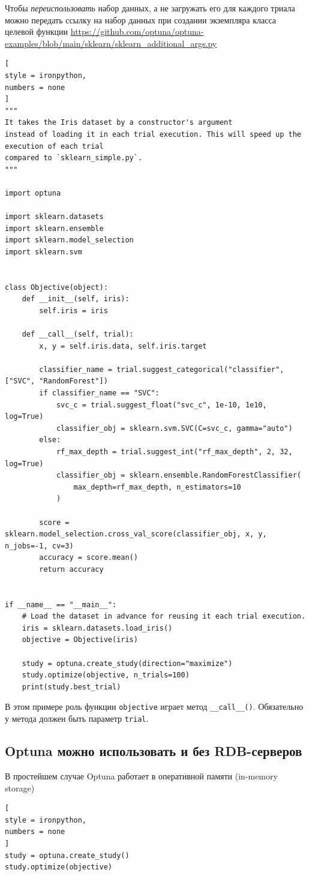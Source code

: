 \documentclass[%
	11pt,
	a4paper,
	utf8,
		]{article}
\begin{document}
Чтобы \emph{переиспользовать} набор данных, а не загружать его для каждого триала можно передать ссылку на набор данных при создании экземпляра класса целевой функции \url{https://github.com/optuna/optuna-examples/blob/main/sklearn/sklearn_additional_args.py}
\begin{lstlisting}[
style = ironpython,
numbers = none
]
"""
It takes the Iris dataset by a constructor's argument
instead of loading it in each trial execution. This will speed up the execution of each trial
compared to `sklearn_simple.py`.
"""

import optuna

import sklearn.datasets
import sklearn.ensemble
import sklearn.model_selection
import sklearn.svm


class Objective(object):
	def __init__(self, iris):
		self.iris = iris

	def __call__(self, trial):
		x, y = self.iris.data, self.iris.target

		classifier_name = trial.suggest_categorical("classifier", ["SVC", "RandomForest"])
		if classifier_name == "SVC":
			svc_c = trial.suggest_float("svc_c", 1e-10, 1e10, log=True)
			classifier_obj = sklearn.svm.SVC(C=svc_c, gamma="auto")
		else:
			rf_max_depth = trial.suggest_int("rf_max_depth", 2, 32, log=True)
			classifier_obj = sklearn.ensemble.RandomForestClassifier(
				max_depth=rf_max_depth, n_estimators=10
			)

		score = sklearn.model_selection.cross_val_score(classifier_obj, x, y, n_jobs=-1, cv=3)
		accuracy = score.mean()
		return accuracy


if __name__ == "__main__":
	# Load the dataset in advance for reusing it each trial execution.
	iris = sklearn.datasets.load_iris()
	objective = Objective(iris)

	study = optuna.create_study(direction="maximize")
	study.optimize(objective, n_trials=100)
	print(study.best_trial)
\end{lstlisting}

В этом примере роль функции \verb|objective| играет метод \verb|__call__()|. Обязательно у метода должен быть параметр \verb|trial|.

\subsection{Optuna можно использовать и без RDB-серверов}

В простейшем случае Optuna работает в оперативной памяти (in-memory storage)
\begin{lstlisting}[
style = ironpython,
numbers = none
]
study = optuna.create_study()
study.optimize(objective)
\end{lstlisting}
\end{document}

